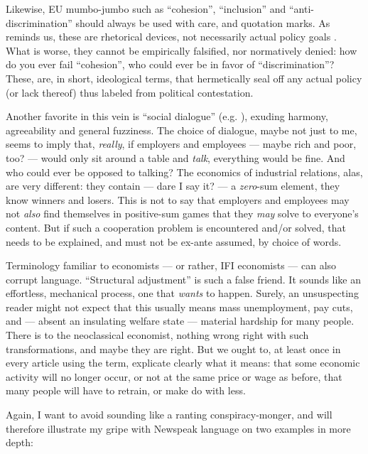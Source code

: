 \documentclass[11pt,a4paper,oneside]{article}
\begin{document}
Likewise, \gls{EU} mumbo-jumbo such as ``cohesion'', ``inclusion'' and ``anti-discrimination'' should always be used with care, and quotation marks. 
As \citeauthor{Offe2003} reminds us, these are rhetorical devices, not necessarily actual policy goals \citeyearpar[461]{Offe2003}. 
What is worse, they cannot be empirically falsified, nor normatively denied: 
how do you ever fail ``cohesion'', who could ever be in favor of ``discrimination''? 
These, are, in short, ideological terms, that hermetically seal off any actual policy (or lack thereof) thus labeled from political contestation.

Another favorite in this vein is ``social dialogue'' (e.g. \citealt{Durr2009}), exuding harmony, agreeability and general fuzziness. 
The choice of dialogue, maybe not just to me, seems to imply that, \emph{really}, if employers and employees --- maybe rich and poor, too? --- would only sit around a table and \emph{talk}, everything would be fine. 
And who could ever be opposed to talking? 
The economics of industrial relations, alas, are very different: 
they contain --- dare I say it? --- a \emph{zero}-sum element, they know winners and losers. 
This is not to say that employers and employees may not \emph{also} find themselves in positive-sum games that they \emph{may} solve to everyone's content. 
But if such a cooperation problem is encountered and/or solved, that needs to be explained, and must not be ex-ante assumed, by choice of words.

Terminology familiar to economists --- or rather, \gls{IFI} economists --- can also corrupt language. 
``Structural adjustment'' \citep[e.g.][19]{Begg2008} is such a false friend. 
It sounds like an effortless, mechanical process, one that \emph{wants} to happen. 
Surely, an unsuspecting reader might not expect that this usually means mass unemployment, pay cuts, and --- absent an insulating welfare state --- material hardship for many people. 
There is to the neoclassical economist, nothing wrong right with such transformations, and maybe they are right. 
But we ought to, at least once in every article using the term, explicate clearly what it means: 
that some economic activity will no longer occur, or not at the same price or wage as before, that many people will have to retrain, or make do with less.

Again, I want to avoid sounding like a ranting conspiracy-monger, and will therefore illustrate my gripe with Newspeak language on two examples in more depth:
\end{document}
